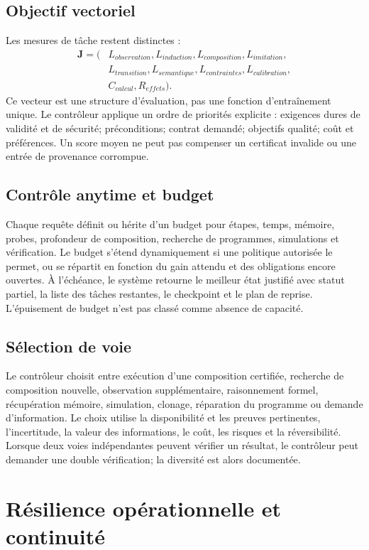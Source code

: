 \documentclass[11pt,a4paper]{article}
\begin{document}
\subsection{Objectif vectoriel}
Les mesures de tâche restent distinctes :
\[
\begin{aligned}
\mathbf{J}=(&L_{observation},L_{induction},L_{composition},L_{imitation},\\
           &L_{transition},L_{semantique},L_{contraintes},L_{calibration},\\
           &C_{calcul},R_{effets}).
\end{aligned}
\]
Ce vecteur est une structure d'évaluation, pas une fonction d'entraînement unique. Le contrôleur applique un ordre de priorités explicite : exigences dures de validité et de sécurité; préconditions; contrat demandé; objectifs qualité; coût et préférences. Un score moyen ne peut pas compenser un certificat invalide ou une entrée de provenance corrompue.

\subsection{Contrôle anytime et budget}
Chaque requête définit ou hérite d'un budget pour étapes, temps, mémoire, probes, profondeur de composition, recherche de programmes, simulations et vérification. Le budget s'étend dynamiquement si une politique autorisée le permet, ou se répartit en fonction du gain attendu et des obligations encore ouvertes. À l'échéance, le système retourne le meilleur état justifié avec statut partiel, la liste des tâches restantes, le checkpoint et le plan de reprise. L'épuisement de budget n'est pas classé comme absence de capacité.

\subsection{Sélection de voie}
Le contrôleur choisit entre exécution d'une composition certifiée, recherche de composition nouvelle, observation supplémentaire, raisonnement formel, récupération mémoire, simulation, clonage, réparation du programme ou demande d'information. Le choix utilise la disponibilité et les preuves pertinentes, l'incertitude, la valeur des informations, le coût, les risques et la réversibilité. Lorsque deux voies indépendantes peuvent vérifier un résultat, le contrôleur peut demander une double vérification; la diversité est alors documentée.

\section{Résilience opérationnelle et continuité}
\end{document}
